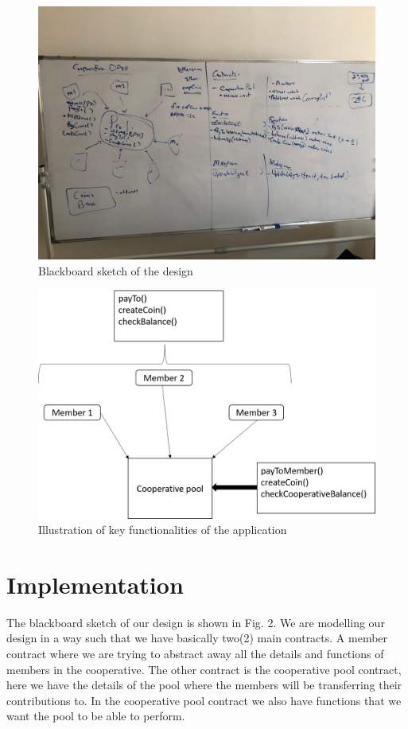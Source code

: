 \documentclass{article}
\begin{document}
\begin{flushleft}
\begin{figure}[H]
\centering
\includegraphics[scale=0.4]{design}
\caption{Blackboard sketch of the design}
\label{fig:dessign}
\end{figure}

\begin{figure}[H]
\centering
\includegraphics[scale=0.4]{KeyFunct.png}
\caption{Illustration of key functionalities of the application}
\label{fig:dessign}
\end{figure}

\section{Implementation}
The blackboard sketch of our design is shown in Fig. 2. We are modelling our design in a way such that we have basically two(2) main contracts. A member contract where we are trying to abstract away all the details and functions of members in the cooperative. The other contract is the cooperative pool contract, here we have the details of the pool where the members will be transferring their contributions to. In the cooperative pool contract we also have functions that we want the pool to be able to perform. 


\end{flushleft}
\end{document}
